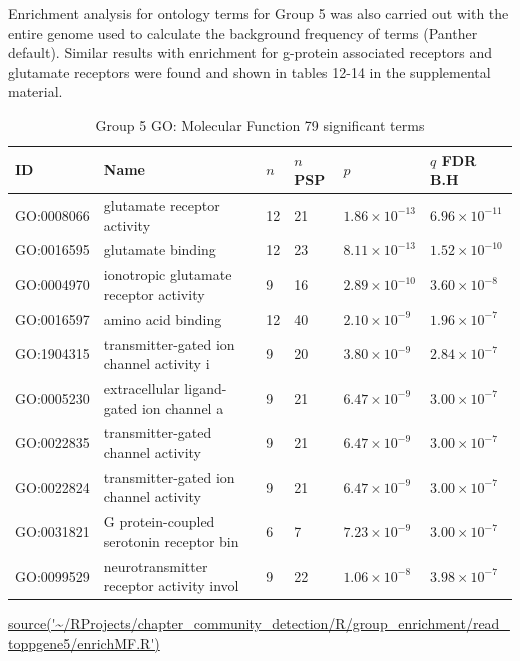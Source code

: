 Enrichment analysis for ontology terms for Group 5 was also carried out with the entire genome  used to calculate the background frequency of terms (Panther default). Similar results with enrichment for g-protein associated receptors and glutamate receptors were found and shown in tables 12-14 in the supplemental material.
\begin{table}[ht]
\centering
\setlength{\extrarowheight}{2pt}
\begin{adjustbox}{width=\textwidth}
\begin{tabular}{llllll}
  \toprule
ID & Name & $n$ & $n$ PSP & $p$ & $q$ FDR B.H \\ 
  \midrule
GO:0008066 & glutamate receptor activity & 12 & 21 & $1.86 \times 10^{-13}$ & $6.96 \times 10^{-11}$ \\ 
  GO:0016595 & glutamate binding & 12 & 23 & $8.11 \times 10^{-13}$ & $1.52 \times 10^{-10}$ \\ 
  GO:0004970 & ionotropic glutamate receptor activity & 9 & 16 & $2.89 \times 10^{-10}$ & $3.60 \times 10^{-8}$ \\ 
  GO:0016597 & amino acid binding & 12 & 40 & $2.10 \times 10^{-9}$ & $1.96 \times 10^{-7}$ \\ 
  GO:1904315 & transmitter-gated ion channel activity i & 9 & 20 & $3.80 \times 10^{-9}$ & $2.84 \times 10^{-7}$ \\ 
  GO:0005230 & extracellular ligand-gated ion channel a & 9 & 21 & $6.47 \times 10^{-9}$ & $3.00 \times 10^{-7}$ \\ 
  GO:0022835 & transmitter-gated channel activity & 9 & 21 & $6.47 \times 10^{-9}$ & $3.00 \times 10^{-7}$ \\ 
  GO:0022824 & transmitter-gated ion channel activity & 9 & 21 & $6.47 \times 10^{-9}$ & $3.00 \times 10^{-7}$ \\ 
  GO:0031821 & G protein-coupled serotonin receptor bin & 6 & 7 & $7.23 \times 10^{-9}$ & $3.00 \times 10^{-7}$ \\ 
  GO:0099529 & neurotransmitter receptor activity invol & 9 & 22 & $1.06 \times 10^{-8}$ & $3.98 \times 10^{-7}$ \\ 
   \bottomrule
\end{tabular}
\end{adjustbox}
\caption{Group 5 GO: Molecular Function 79 significant terms} 
\tiny\url{source('~/RProjects/chapter_community_detection/R/group_enrichment/read_toppgene5/enrichMF.R')}
\label{tab:Group 5 GO: Molecular Function 79 significant terms}
\end{table}

